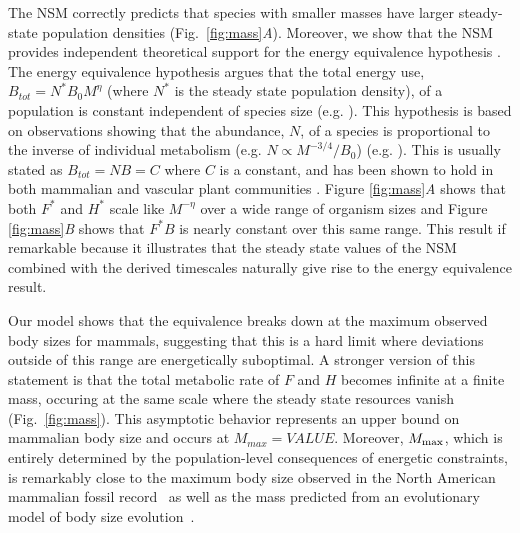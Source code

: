 \documentclass{pnastwo}
\begin{document}
\begin{article}
The NSM correctly predicts that species with smaller masses have larger steady-state population densities (Fig.~\ref{fig:mass}\emph{A}).
Moreover, we show that the NSM provides independent theoretical support for the energy equivalence hypothesis \cite{allen2002,enquist1998}.
The energy equivalence hypothesis argues that the total energy use, $B_{tot}=N^*B_0M^\eta$ (where $N^*$ is the steady state population density), of a population is constant independent of species size (e.g. \cite{allen2002,enquist1998}). %
This hypothesis is based on observations showing that the abundance, $N$, of a species is proportional to the inverse of individual metabolism (e.g. $N\propto M^{-3/4}/B_{0}$)  (e.g. \cite{allen2002,enquist1998}).
This is usually stated as $B_{tot}=NB=C$ where $C$ is a constant, and has been shown to hold in both mammalian and vascular plant communities \cite{allen2002,enquist1998}.
Figure \ref{fig:mass}\emph{A} shows that both $F^{*}$ and $H^{*}$ scale like $M^{-\eta}$ over a wide range of organism sizes and Figure \ref{fig:mass}\emph{B} shows that $F^{*}B$ is nearly constant over this same range.
This result if remarkable because it illustrates that the steady state values of the NSM combined with the derived timescales naturally give rise to the energy equivalence result.
{\color{red} Our model shows that the equivalence breaks down at the maximum observed body sizes for mammals, suggesting that this is a hard limit where deviations outside of this range are energetically suboptimal. %
A stronger version of this statement is that the total metabolic rate of $F$ and $H$ becomes infinite at a finite mass, occuring at the same scale where the steady state resources vanish (Fig.~\ref{fig:mass}). This asymptotic behavior represents an upper bound on mammalian body size and occurs at $M_{max}=VALUE$. Moreover, $M_{\rm max}$, which is entirely determined by the population-level consequences of energetic constraints, is remarkably close to the maximum body size observed in the North American mammalian fossil record~\cite{Alroy:1998p1594} as well as the mass predicted from an evolutionary model of body size evolution~\cite{Clauset:2009fh}.


}
\end{article}
\end{document}
